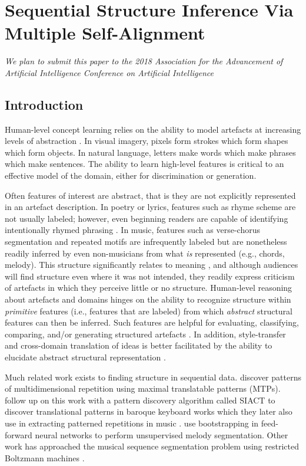 \documentclass[phd,electronic,oneside,twosidetoc,letterpaper,chaptercenter,parttop,lol,lof,lot]{byumsphd}
\begin{document}
\chapter{Sequential Structure Inference Via Multiple Self-Alignment}

\emph{We plan to submit this paper to the 2018 Association for the Advancement of Artificial Intelligence Conference on Artificial Intelligence}
\section{Introduction}

Human-level concept learning relies on the ability to model artefacts at increasing levels of abstraction \cite{lake2015human}. In visual imagery, pixels form strokes which form shapes which form objects. In natural language, letters make words which make phrases which make sentences. The ability to learn high-level features is critical to an effective model of the domain, either for discrimination or generation.

Often features of interest are abstract, that is they are not explicitly represented in an artefact description. In poetry or lyrics, features such as rhyme scheme are not usually labeled; however, even beginning readers are capable of identifying intentionally rhymed phrasing \cite{englemann1974distar}. In music, features such as verse-chorus segmentation and repeated motifs are infrequently labeled but are nonetheless readily inferred by even non-musicians from what \textit{is} represented (e.g., chords, melody). This structure significantly relates to meaning \cite{Nunes2014}, and although audiences will find structure even where it was not intended, they readily express criticism of artefacts in which they perceive little or no structure. Human-level reasoning about artefacts and domains hinges on the ability to recognize structure within \textit{primitive} features (i.e., features that are labeled) from which \textit{abstract} structural features can then be inferred.  Such features are helpful for evaluating, classifying, comparing, and/or generating structured artefacts \cite{Bodily2017ComputationalLearning}. In addition, style-transfer and cross-domain translation of ideas is better facilitated by the ability to elucidate abstract structural representation \cite{lecun2015deep}.

Much related work exists to finding structure in sequential data. \citeauthor{meredith2002algorithms} \cite{meredith2002algorithms} discover patterns of multidimensional repetition using maximal translatable patterns (MTPs). \citeauthor{collins2010comparative} \cite{collins2010comparative} follow up on this work with a pattern discovery algorithm called SIACT to discover translational patterns in baroque keyboard works which they later also use in extracting patterned repetitions in music \citeauthor{collins2017computer} \cite{collins2017computer}. \citeauthor{lattner2015pseudo} \cite{lattner2015pseudo} use bootstrapping in feed-forward neural networks to perform unsupervised melody segmentation. Other work has approached the musical sequence segmentation problem using restricted Boltzmann machines \citeauthor{lattner2015probabilistic} \cite{lattner2015probabilistic}.
\end{document}
